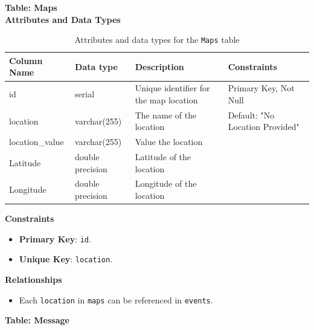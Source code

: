\documentclass[12pt]{article}
\begin{document}
\pagebreak
\textbf{Table: Maps} \\

\textbf{Attributes and Data Types}
\begin{table}[H]
    \centering
    \renewcommand{\arraystretch}{1.5}
    \begin{tabular}{|l|l|p{2.1cm}|l|}
    \hline
    \rowcolor[HTML]{96FFFB} 
    \textbf{Column Name} & \textbf{Data type} & \textbf{Description}                   & \textbf{Constraints}            \\ \hline
    id                   & serial             & Unique identifier for the map location & Primary Key, Not Null           \\ \hline
    location             & varchar(255)       & The name of the location               & Default: "No Location Provided" \\ \hline
    location\_value      & varchar(255)       & Value the location                     &                                 \\ \hline
    Latitude             & double precision   & Latitude of the location               &                                 \\ \hline
    Longitude            & double precision   & Longitude of the location              &                                 \\ \hline
    \end{tabular}
    \caption{Attributes and data types for the \texttt{Maps} table}
\end{table}

\noindent
\textbf{Constraints}
\begin{itemize}
    \item \textbf{Primary Key}: \texttt{id}.
    \item \textbf{Unique Key}: \texttt{location}.
\end{itemize}

\noindent
\textbf{Relationships} 
\begin{itemize}
    \item Each \texttt{location} in \texttt{maps} can be referenced in \texttt{events}.
\end{itemize}

\pagebreak

\textbf{Table: Message} \\
\end{document}
